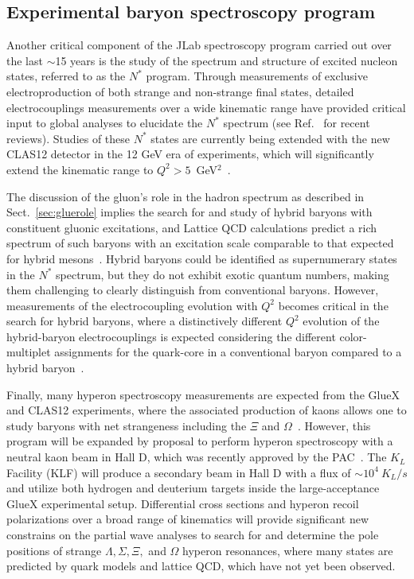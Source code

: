 \subsection{Experimental baryon spectroscopy program}
\label{sec:expbaryons}

Another critical component of the JLab spectroscopy program carried out over the last $\sim$15 years is the study of the spectrum and structure of excited nucleon states, referred to as the $N^*$ program.  Through measurements of exclusive electroproduction of both strange and non-strange final states, detailed electrocouplings measurements over a wide kinematic range have provided critical input to global analyses to elucidate the $N^*$ spectrum (see Ref.~\cite{Carman:2019lkk,Carman:2020qmb} for recent reviews). Studies of these $N^*$ states are currently being extended with the new CLAS12 detector in the 12 GeV era of experiments, which will significantly extend the kinematic range to $Q^2 > 5$~GeV$^2$~\cite{E12-09-003,E12-06-108A}.  

The discussion of the gluon's role in the hadron spectrum as described in Sect.~\ref{sec:gluerole} implies the search for and study of hybrid baryons with constituent gluonic excitations, and Lattice QCD calculations predict a rich spectrum of such baryons with an excitation scale comparable to that expected for hybrid mesons~\cite{Dudek:2012ag}. Hybrid baryons could be identified as supernumerary states in the $N^*$ spectrum, but they do not exhibit exotic quantum numbers, making them challenging to clearly distinguish from conventional baryons. However, measurements of the electrocoupling evolution with $Q^2$ becomes critical in the search for hybrid baryons, where a distinctively different $Q^2$ evolution of the hybrid-baryon electrocouplings is expected considering the different color-multiplet assignments for the quark-core in a conventional baryon compared to a hybrid baryon~\cite{E12-16-010}.


Finally, many hyperon spectroscopy measurements are expected from the GlueX and CLAS12 experiments, where the associated production of kaons allows one to study baryons with net strangeness including the $\Xi$ and $\Omega$~\cite{GlueX:2014hxq,E12-12-008}.  However, this program will be expanded by proposal to perform hyperon spectroscopy with a neutral kaon beam in Hall D, which was recently approved by the PAC~\cite{KLF:2020gai}.  The $K_L$ Facility (KLF) will produce a secondary beam in Hall D with a flux of $\sim10^4~K_L/s$ and utilize both hydrogen and deuterium targets inside the large-acceptance GlueX experimental setup.  Differential cross sections and hyperon recoil polarizations over a broad range of kinematics will provide significant new constrains on the partial wave analyses to search for and determine the pole positions of strange $\Lambda, \Sigma, \Xi,$ and $\Omega$ hyperon resonances, where many states are predicted by quark models and lattice QCD, which have not yet been observed.  %

